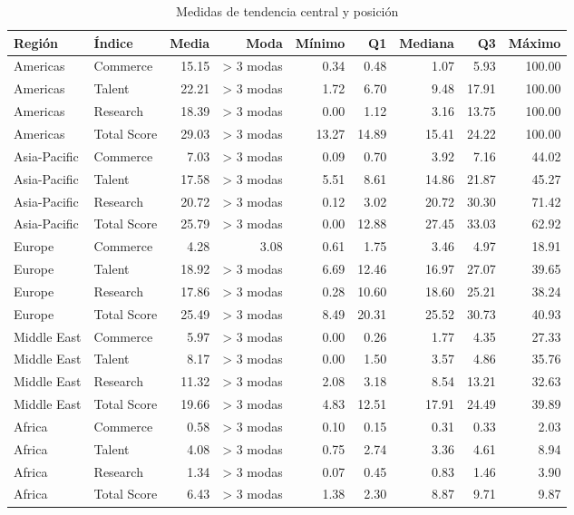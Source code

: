 \documentclass[
]{article}
\begin{document}
\renewcommand{\arraystretch}{1.3}
\begin{scriptsize}
\begin{longtable}[t]{llrrrrrrr}
\caption{\label{tab:tabla2}Medidas de tendencia central y posición}\\
\toprule
Región & Índice & Media & Moda & Mínimo & Q1 & Mediana & Q3 & Máximo\\
\midrule
Americas & Commerce & 15.15 & > 3 modas & 0.34 & 0.48 & 1.07 & 5.93 & 100.00\\
Americas & Talent & 22.21 & > 3 modas & 1.72 & 6.70 & 9.48 & 17.91 & 100.00\\
Americas & Research & 18.39 & > 3 modas & 0.00 & 1.12 & 3.16 & 13.75 & 100.00\\
Americas & Total Score & 29.03 & > 3 modas & 13.27 & 14.89 & 15.41 & 24.22 & 100.00\\
Asia-Pacific & Commerce & 7.03 & > 3 modas & 0.09 & 0.70 & 3.92 & 7.16 & 44.02\\
\addlinespace
Asia-Pacific & Talent & 17.58 & > 3 modas & 5.51 & 8.61 & 14.86 & 21.87 & 45.27\\
Asia-Pacific & Research & 20.72 & > 3 modas & 0.12 & 3.02 & 20.72 & 30.30 & 71.42\\
Asia-Pacific & Total Score & 25.79 & > 3 modas & 0.00 & 12.88 & 27.45 & 33.03 & 62.92\\
Europe & Commerce & 4.28 & 3.08 & 0.61 & 1.75 & 3.46 & 4.97 & 18.91\\
Europe & Talent & 18.92 & > 3 modas & 6.69 & 12.46 & 16.97 & 27.07 & 39.65\\
\addlinespace
Europe & Research & 17.86 & > 3 modas & 0.28 & 10.60 & 18.60 & 25.21 & 38.24\\
Europe & Total Score & 25.49 & > 3 modas & 8.49 & 20.31 & 25.52 & 30.73 & 40.93\\
Middle East & Commerce & 5.97 & > 3 modas & 0.00 & 0.26 & 1.77 & 4.35 & 27.33\\
Middle East & Talent & 8.17 & > 3 modas & 0.00 & 1.50 & 3.57 & 4.86 & 35.76\\
Middle East & Research & 11.32 & > 3 modas & 2.08 & 3.18 & 8.54 & 13.21 & 32.63\\
\addlinespace
Middle East & Total Score & 19.66 & > 3 modas & 4.83 & 12.51 & 17.91 & 24.49 & 39.89\\
Africa & Commerce & 0.58 & > 3 modas & 0.10 & 0.15 & 0.31 & 0.33 & 2.03\\
Africa & Talent & 4.08 & > 3 modas & 0.75 & 2.74 & 3.36 & 4.61 & 8.94\\
Africa & Research & 1.34 & > 3 modas & 0.07 & 0.45 & 0.83 & 1.46 & 3.90\\
Africa & Total Score & 6.43 & > 3 modas & 1.38 & 2.30 & 8.87 & 9.71 & 9.87\\
\bottomrule
\end{longtable}

\end{scriptsize}\renewcommand{\arraystretch}{1}
\end{document}

